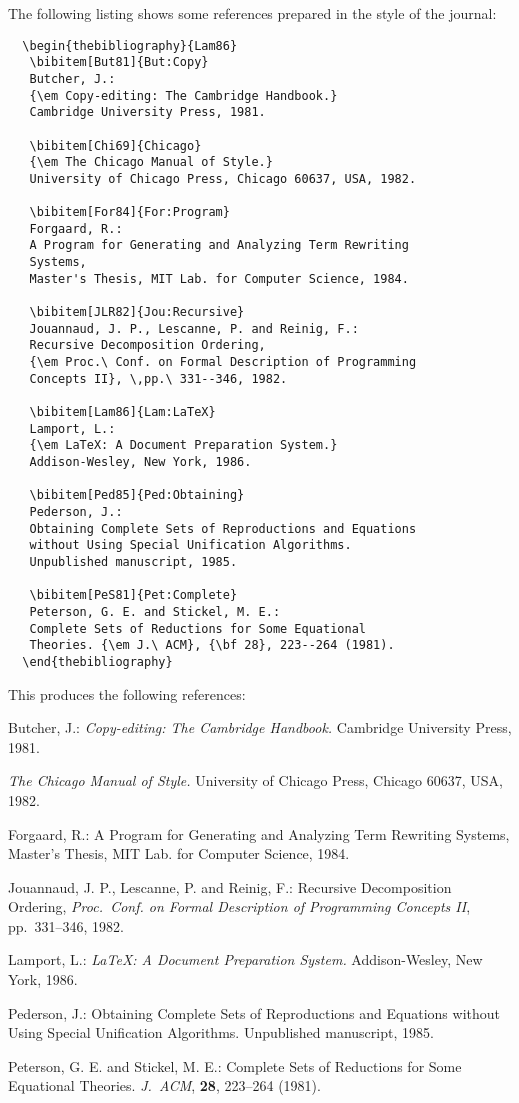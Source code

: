 The following listing shows some references prepared in the style of the
journal:
%
\begin{verbatim}
  \begin{thebibliography}{Lam86}
   \bibitem[But81]{But:Copy}
   Butcher, J.:
   {\em Copy-editing: The Cambridge Handbook.}
   Cambridge University Press, 1981.

   \bibitem[Chi69]{Chicago}
   {\em The Chicago Manual of Style.}
   University of Chicago Press, Chicago 60637, USA, 1982.

   \bibitem[For84]{For:Program}
   Forgaard, R.:
   A Program for Generating and Analyzing Term Rewriting
   Systems,
   Master's Thesis, MIT Lab. for Computer Science, 1984.

   \bibitem[JLR82]{Jou:Recursive}
   Jouannaud, J. P., Lescanne, P. and Reinig, F.:
   Recursive Decomposition Ordering,
   {\em Proc.\ Conf. on Formal Description of Programming
   Concepts II}, \,pp.\ 331--346, 1982.

   \bibitem[Lam86]{Lam:LaTeX}
   Lamport, L.:
   {\em LaTeX: A Document Preparation System.}
   Addison-Wesley, New York, 1986.

   \bibitem[Ped85]{Ped:Obtaining}
   Pederson, J.:
   Obtaining Complete Sets of Reproductions and Equations
   without Using Special Unification Algorithms.
   Unpublished manuscript, 1985.

   \bibitem[PeS81]{Pet:Complete}
   Peterson, G. E. and Stickel, M. E.:
   Complete Sets of Reductions for Some Equational
   Theories. {\em J.\ ACM}, {\bf 28}, 223--264 (1981).
  \end{thebibliography}
\end{verbatim}
%
This produces the following references:
%
\begin{thebibliography}{Lam86}
%
Butcher, J.:
{\em Copy-editing: The Cambridge Handbook.}
Cambridge University Press, 1981.

{\em The Chicago Manual of Style.}
University of Chicago Press, Chicago 60637, USA, 1982.

Forgaard, R.:
A Program for Generating and Analyzing Term Rewriting Systems,
Master's Thesis, MIT Lab. for Computer Science, 1984.

Jouannaud, J. P., Lescanne, P. and Reinig, F.:
Recursive Decomposition Ordering,
{\em Proc.\ Conf. on Formal Description of Programming Concepts
II}, \,pp.\ 331--346, 1982.

Lamport, L.:
{\em LaTeX: A Document Preparation System.}
Addison-Wesley, New York, 1986.

Pederson, J.:
Obtaining Complete Sets of Reproductions and Equations without Using
Special Unification Algorithms. Unpublished manuscript, 1985.

Peterson, G. E. and Stickel, M. E.:
Complete Sets of Reductions for Some Equational Theories. {\em J.\ ACM},
{\bf 28}, 223--264 (1981).
%
\end{thebibliography}

\label{lastpage}


